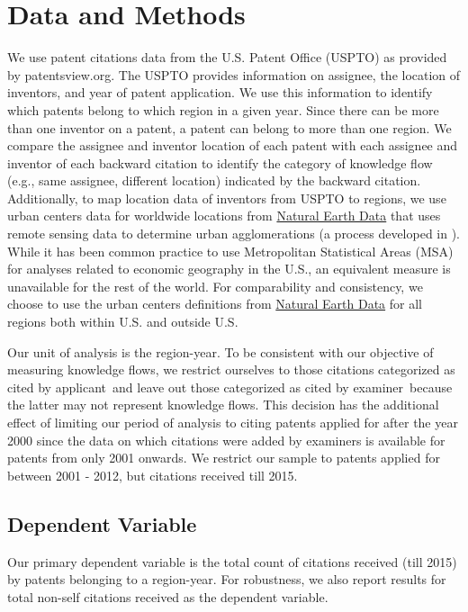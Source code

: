 \documentclass[12pt,letterpaper]{article}
\begin{document}
\section*{Data and Methods}

We use patent citations data from the U.S. Patent Office (USPTO) as provided by patentsview.org. The USPTO provides information on assignee, the location of inventors, and year of patent application. We use this information to identify which patents belong to which region in a given year. Since there can be more than one inventor on a patent, a patent can belong to more than one region. We compare the assignee and inventor location of each patent with each assignee and inventor of each backward citation  to identify the category of knowledge flow (e.g., same assignee, different location) indicated by the backward citation. Additionally, to map location data of inventors from USPTO to regions, we use urban centers data for worldwide locations from \href{http://www.naturalearthdata.com/downloads/10m-cultural-vectors/}{Natural Earth Data} that uses remote sensing data to determine urban agglomerations (a process developed in \citet*{Schneider2003}).  While it has been common practice to use Metropolitan Statistical Areas (MSA) for analyses related to economic geography in the U.S., an equivalent measure is unavailable for the rest of the world. For comparability and consistency, we choose to use the urban centers definitions from \href{http://www.naturalearthdata.com/downloads/10m-cultural-vectors/}{Natural Earth Data} for all regions both within U.S. and outside U.S. \par
Our unit of analysis is the region-year. To be consistent with our objective of measuring knowledge flows, we restrict ourselves to those citations categorized as \textquotesingle cited by applicant\textquotesingle \ and leave out those categorized as \textquotesingle cited by examiner\textquotesingle \ because the latter may not represent knowledge flows. This decision has the additional effect of limiting our period of analysis to citing patents applied for after the year 2000 since the data on which citations were added by examiners is available for patents from only 2001 onwards. We restrict our sample to patents applied for between 2001 - 2012, but citations received till 2015. \par
\subsection{Dependent Variable}
Our primary dependent variable is the  total count of citations received (till 2015) by patents belonging to a region-year. For robustness, we also report results for total non-self citations received as the dependent variable. 
\end{document}

